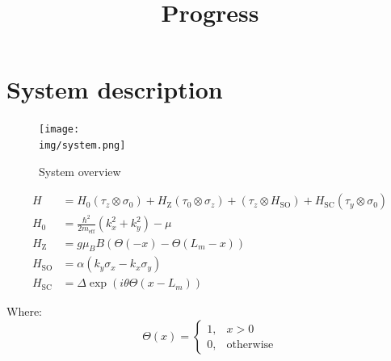 \documentclass[10pt,a4paper]{article}
\newcommand{\kx}{k_x}
\newcommand{\ky}{k_y}
\newcommand{\meff}{m_\text{eff}}
\newcommand{\img}{./images}
\begin{document}
\title{Progress}
\maketitle
\section{System description}
	\begin{figure}[H]
		\texttt{[image: \\img/system.png]}
		\caption{System overview}
	\end{figure}
	
	\begin{align}
		H &= H_0(\tau_z \otimes \sigma_0) + 
		H_\text{Z} (\tau_0 \otimes \sigma_z) +
		(\tau_z \otimes H_\text{SO}) +
	 H_\text{SC}(\tau_y \otimes \sigma_0) \\
		H_0 &= \frac{\hbar^2}{2\meff}\left(\kx^2 + \ky^2\right) - \mu \\
		H_\text{Z} &= g \mu_B B  \left(\Theta(-x) - \Theta(L_m-x)\right)  \\
		H_\text{SO} &= \alpha \left( \ky \sigma_x - \kx \sigma_y \right)\\
		H_\text{SC} &= \Delta \exp \left(i \theta \Theta(x-L_m) \right)
	\end{align}

	Where: 
	\begin{equation}
	\Theta(x) = 
	\begin{cases}
	1,& x>0\\
	0,& \text{otherwise}
	\end{cases}
	\end{equation}
\end{document}
